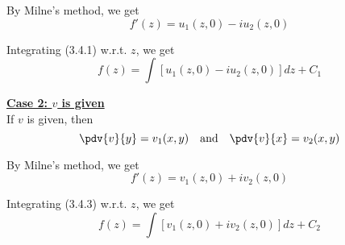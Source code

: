 By Milne's method, we get
\begin{equation}
    f'(z) = u_1(z,0) - iu_2(z,0)
\end{equation} 

Integrating (3.4.1) w.r.t. $z$, we get
\begin{equation}
    f(z) = \int \left[ u_1(z,0) - iu_2(z,0) \right] dz + C_1
\end{equation}

\underline{\textbf{Case 2: $v$ is given}} \\
If $v$ is given, then \[
    \pdv{v}{y} = v_1(x,y) \quad \text{and} \quad \pdv{v}{x} = v_2(x,y)
\] 

By Milne's method, we get
\begin{equation}
    f'(z) = v_1(z,0) + iv_2(z,0)
\end{equation}

Integrating (3.4.3) w.r.t. $z$, we get
\begin{equation}
    f(z) = \int \left[ v_1(z,0) + iv_2(z,0) \right] dz + C_2
\end{equation}

